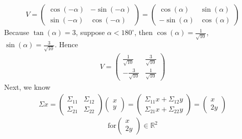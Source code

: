 \documentclass{article}
\begin{document}
    \subsection{}\label{2.2}
        \begin{align*}
            V=
            \begin{pmatrix}
                \cos(-\alpha) &-\sin(-\alpha)\\
                \sin(-\alpha) &\cos(-\alpha)
            \end{pmatrix}
            =\begin{pmatrix}
                \cos(\alpha) &\sin(\alpha)\\
                -\sin(\alpha) &\cos(\alpha)
            \end{pmatrix}
        \end{align*}
        Because $\tan(\alpha)=3$, suppose $\alpha<180^\circ$,
        then $\cos(\alpha)=\frac{1}{\sqrt{10}}$, $\sin(\alpha)=\frac{3}{\sqrt{10}}$. Hence
        \begin{align*}
            V=
            \begin{pmatrix}
                \frac{1}{\sqrt{10}} &\frac{3}{\sqrt{10}}\\
                -\frac{3}{\sqrt{10}} &\frac{1}{\sqrt{10}}
            \end{pmatrix}
        \end{align*}
        Next, we know 
        \begin{align*}
            \Sigma x=
            \begin{pmatrix}
                \Sigma_{11} &\Sigma_{12}\\
                \Sigma_{21} &\Sigma_{22}
            \end{pmatrix}
            \begin{pmatrix}
                x\\
                y
            \end{pmatrix}
            =\begin{pmatrix}
                \Sigma_{11}x+\Sigma_{12}y\\
                \Sigma_{21}x+\Sigma_{22}y
            \end{pmatrix}
            =\begin{pmatrix}
                x\\
                2y
            \end{pmatrix}
        \end{align*}
        \begin{equation*}
            \text{for} \begin{pmatrix}
                x\\
                2y
            \end{pmatrix}\in \mathbb{R}^2
        \end{equation*}
\end{document}
